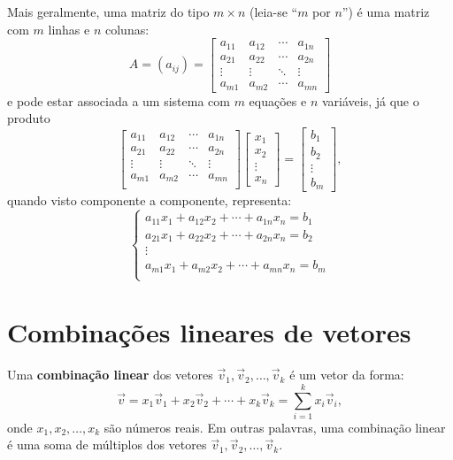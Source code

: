 \documentclass[../livro.tex]{subfiles}  %
\begin{document}
Mais geralmente, uma matriz do tipo $m\times n$ (leia-se ``$m$ por $n$'') é uma matriz com $m$ linhas e $n$ colunas:
\[
A = \left(a_{ij}\right) =
\begin{bmatrix}
a_{11}&a_{12}&\cdots &a_{1n}\\
a_{21}&a_{22}&\cdots &a_{2n}\\
\vdots &\vdots &\ddots &\vdots \\
a_{m1}&a_{m2}&\cdots &a_{mn}
\end{bmatrix}
\] e pode estar associada a um sistema com $m$ equações e $n$ variáveis, já que o produto
\[
\left[
  \begin{array}{cccc}
  a_{11}&a_{12}&\cdots &a_{1n}\\
  a_{21}&a_{22}&\cdots &a_{2n}\\
  \vdots &\vdots &\ddots &\vdots \\
  a_{m1}&a_{m2}&\cdots &a_{mn} \\
\end{array}
\right]
\left[
  \begin{array}{c}
    x_1 \\
    x_2 \\
    \vdots \\
    x_n
  \end{array}
\right] =
\left[
  \begin{array}{c}
    b_1 \\
    b_2 \\
    \vdots \\
    b_m
  \end{array}
\right],
\] quando visto componente a componente, representa:
\[
\left\{
  \begin{array}{cc}
  a_{11} x_1 + a_{12} x_2 + \cdots + a_{1n} x_n =  b_1 \\
  a_{21} x_1 + a_{22} x_2 + \cdots + a_{2n} x_n =  b_2 \\
    \vdots \\
  a_{m1} x_1 + a_{m2} x_2 + \cdots + a_{mn} x_n =  b_m \\
\end{array}
\right.
\]





\section{Combinações lineares de vetores}

Uma \textbf{combinação linear} dos vetores $\vec{v}_1, \vec{v}_2, \dots, \vec{v}_k$ é um vetor da forma:
\[
\vec{v} = x_1 \vec{v}_1 + x_2 \vec{v}_2 + \cdots + x_k \vec{v}_k = \sum_{i=1}^k x_i \vec{v}_i,
\] onde $x_1, x_2, \dots, x_k$ são números reais. Em outras palavras, uma combinação linear é uma soma de múltiplos dos vetores $\vec{v}_1, \vec{v}_2, \dots, \vec{v}_k$.
\end{document}
